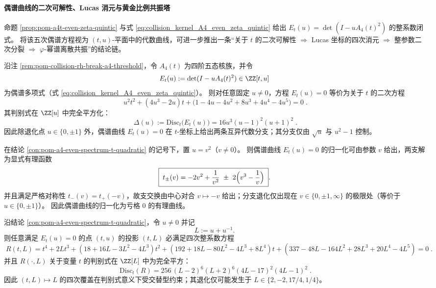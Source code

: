 \paragraph{偶谱曲线的二次可解性、Lucas 消元与黄金比例共振塔}
命题 \ref{prop:pom-a4t-even-zeta-quintic} 与式 \eqref{eq:collision_kernel_A4_even_zeta_quintic} 给出 \(E_t(u)=\det(I-uA_4(t)^2)\) 的整系数闭式。
将该五次偶谱方程视为 \((t,u)\)-平面中的代数曲线，可进一步推出一条“关于 \(t\) 的二次可解性 \(\Rightarrow\) Lucas 坐标的四次消元 \(\Rightarrow\) 整参数二次分裂 \(\Rightarrow\) \(\varphi\)-幂谱离散共振”的结论链。

\begin{conclusion}\label{con:pom-a4-even-spectrum-t-quadratic}
沿注 \ref{rem:pom-collision-rh-break-a4-threshold}，令 \(A_4(t)\) 为四阶五态核族，并令
\[
E_t(u):=\det(I-uA_4(t)^2)\in\ZZ[t,u]
\]
为偶谱多项式（式 \eqref{eq:collision_kernel_A4_even_zeta_quintic}）。
则对任意固定 \(u\neq 0\)，方程 \(E_t(u)=0\) 等价为关于 \(t\) 的二次方程
\[
\boxed{\;
u^2 t^2+(4u^3-2u)t+\bigl(1-4u-4u^2+8u^3+4u^4-4u^5\bigr)=0\; } .
\]
其判别式在 \(\ZZ[u]\) 中完全平方化：
\[
\boxed{\;
\Delta(u):=\mathrm{Disc}_t\!\bigl(E_t(u)\bigr)
=16u^3(u-1)^2(u+1)^2\; } .
\]
因此除退化点 \(u\in\{0,\pm1\}\) 外，偶谱曲线 \(E_t(u)=0\) 在 \(t\)-坐标上给出两条互异代数分支；其分支仅由 \(\sqrt u\) 与 \(u^2-1\) 控制。
\end{conclusion}

\begin{conclusion}[全局有理参数化：\texorpdfstring{$u=v^2$}{u=v^2} 归一化与支交换对合]\label{con:pom-a4-even-spectrum-rational-param}
在结论 \ref{con:pom-a4-even-spectrum-t-quadratic} 的记号下，置 \(u=v^2\)（\(v\neq 0\)）。
则偶谱曲线 \(E_t(u)=0\) 的归一化可由参数 \(v\) 给出，两支解为显式有理函数
\[
\boxed{\;
t_{\pm}(v)= -2v^2+\frac{1}{v^2}\ \pm\ 2\Bigl(v^3-\frac{1}{v}\Bigr)\; } .
\]
并且满足严格对称性 \(t_{-}(v)=t_{+}(-v)\)，故支交换由中心对合 \(v\mapsto -v\) 给出；分支退化仅出现在 \(v\in\{0,\pm1,\infty\}\) 的极限处（等价于 \(u\in\{0,\pm1\}\)）。
因此偶谱曲线的归一化为亏格 \(0\) 的有理曲线。
\end{conclusion}

\begin{conclusion}\label{con:pom-a4-even-spectrum-lucas-elimination}
沿结论 \ref{con:pom-a4-even-spectrum-t-quadratic}，令 \(u\neq 0\) 并记
\[
L:=u+u^{-1}.
\]
则任意满足 \(E_t(u)=0\) 的点 \((t,u)\) 的投影 \((t,L)\) 必满足四次整系数方程
\[
\boxed{\;
R(t,L)=t^4+2Lt^3+(18+16L-3L^2-4L^3)t^2+(192+18L-80L^2-4L^3+8L^4)t
+(337-48L-164L^2+28L^3+20L^4-4L^5)=0\; } .
\]
并且 \(R(\cdot,L)\) 关于变量 \(t\) 的判别式在 \(\ZZ[L]\) 中为完全平方：
\[
\boxed{\;
\mathrm{Disc}_t(R)=256\,(L-2)^6(L+2)^6(4L-17)^2(4L-1)^2\; } .
\]
因此 \((t,L)\mapsto L\) 的四次覆盖在判别式意义下受交替型约束；其退化仅可能发生于
\(
L\in\{2,-2,17/4,1/4\}
\)。
\end{conclusion}

